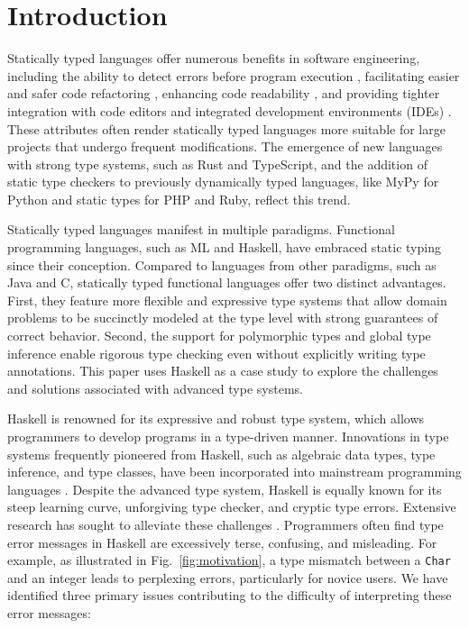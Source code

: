 \documentclass[pdflatex,lineno,sn-nature,Numbered]{sn-jnl}%
\begin{document}
\section{Introduction} \label{sec:introduction}

Statically typed languages offer numerous benefits in software engineering, including the ability to detect errors before program execution \cite{Ray2017-gq,Gao2017-xn}, facilitating easier and safer code refactoring \cite{Kleinschmager2012-bg}, enhancing code readability \cite{Endrikat2014-uz}, and providing tighter integration with code editors and integrated development environments (IDEs) \cite{Mayer2012-ko}. These attributes often render statically typed languages more suitable for large projects that undergo frequent modifications. The emergence of new languages with strong type systems, such as Rust and TypeScript, and the addition of static type checkers to previously dynamically typed languages, like MyPy for Python and static types for PHP and Ruby, reflect this trend.

Statically typed languages manifest in multiple paradigms. Functional programming languages, such as ML and Haskell, have embraced static typing since their conception. Compared to languages from other paradigms, such as Java and C, statically typed functional languages offer two distinct advantages. First, they feature more flexible and expressive type systems that allow domain problems to be succinctly modeled at the type level with strong guarantees of correct behavior. Second, the support for polymorphic types and global type inference enable rigorous type checking even without explicitly writing type annotations. This paper uses Haskell as a case study to explore the challenges and solutions associated with advanced type systems.

Haskell is renowned for its expressive and robust type system, which allows programmers to develop programs in a type-driven manner. Innovations in type systems frequently pioneered from Haskell, such as algebraic data types, type inference, and type classes, have been incorporated into mainstream programming languages \cite{Hudak2007-kn, TypeScriptTeam_undated-qk, Klabnik_undated-mp, Griesemer_undated-ff}. Despite the advanced type system, Haskell is equally known for its steep learning curve, unforgiving type checker, and cryptic type errors. Extensive research has sought to alleviate these challenges \cite{Tirronen2015-nr, Chen2014-dz, Heeren2003-kd, Zhang2015-xy, Lerner2007-yq, Zhang2017-tj}. Programmers often find type error messages in Haskell are excessively terse, confusing, and misleading. For example, as illustrated in Fig.~\ref{fig:motivation}, a type mismatch between a {\tt Char} and an integer leads to perplexing errors, particularly for novice users. We have identified three primary issues contributing to the difficulty of interpreting these error messages:
\end{document}
